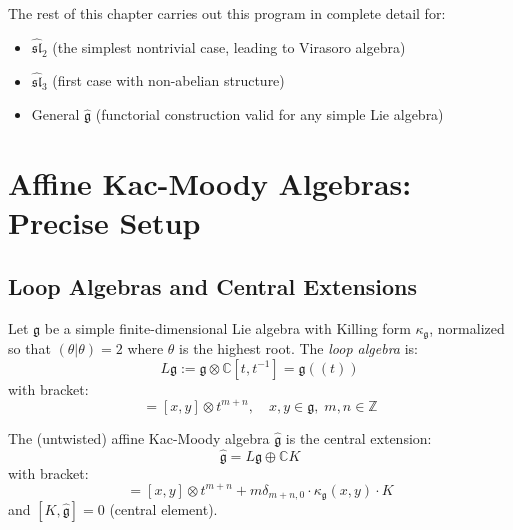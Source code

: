 The rest of this chapter carries out this program in complete detail for:
\begin{itemize}
\item $\widehat{\mathfrak{sl}}_2$ (the simplest nontrivial case, leading to Virasoro algebra)
\item $\widehat{\mathfrak{sl}}_3$ (first case with non-abelian structure)
\item General $\widehat{\mathfrak{g}}$ (functorial construction valid for any simple Lie algebra)
\end{itemize}

\section{Affine Kac-Moody Algebras: Precise Setup}

\subsection{Loop Algebras and Central Extensions}

\begin{definition}\label{def:loop-algebra}
Let $\mathfrak{g}$ be a simple finite-dimensional Lie algebra with Killing form $\kappa_{\mathfrak{g}}$, normalized so that $(\theta|\theta) = 2$ where $\theta$ is the highest root. The \emph{loop algebra} is:
\begin{equation}
L\mathfrak{g} := \mathfrak{g} \otimes \mathbb{C}[t,t^{-1}] = \mathfrak{g}((t))
\end{equation}
with bracket:
\begin{equation}
[x \otimes t^m, y \otimes t^n] = [x,y] \otimes t^{m+n}, \quad x,y \in \mathfrak{g}, \; m,n \in \mathbb{Z}
\end{equation}
\end{definition}

\begin{definition}\label{def:affine-kac-moody}
The (untwisted) affine Kac-Moody algebra $\widehat{\mathfrak{g}}$ is the central extension:
\begin{equation}
\widehat{\mathfrak{g}} = L\mathfrak{g} \oplus \mathbb{C} K
\end{equation}
with bracket:
\begin{equation}
[x \otimes t^m, y \otimes t^n] = [x,y] \otimes t^{m+n} + m \delta_{m+n,0} \cdot \kappa_{\mathfrak{g}}(x,y) \cdot K
\end{equation}
and $[K, \widehat{\mathfrak{g}}] = 0$ (central element).
\end{definition}


